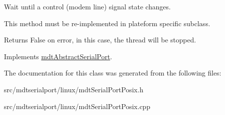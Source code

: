 Wait until a control (modem line) signal state changes. 

This method must be re-\/implemented in plateform specific subclass. \begin{DoxyReturn}{Returns}
False on error, in this case, the thread will be stopped. 
\end{DoxyReturn}


Implements \hyperlink{classmdt_abstract_serial_port_ac27d1224db349bcf7f161329b5f53efb}{mdtAbstractSerialPort}.



The documentation for this class was generated from the following files:\begin{DoxyCompactItemize}
\item 
src/mdtserialport/linux/mdtSerialPortPosix.h\item 
src/mdtserialport/linux/mdtSerialPortPosix.cpp\end{DoxyCompactItemize}
